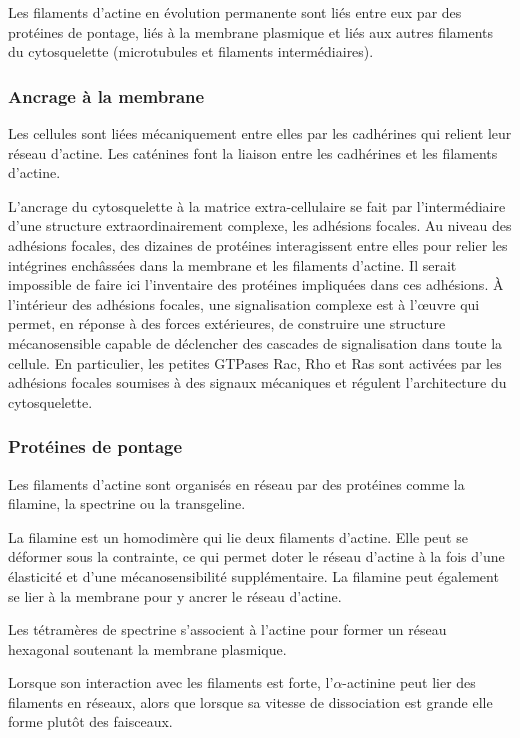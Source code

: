 Les filaments d'actine en évolution permanente sont liés entre eux par des protéines de pontage, liés à la membrane plasmique et liés aux autres filaments du cytosquelette (microtubules et filaments intermédiaires). 


\subsubsection{Ancrage à la membrane}

Les cellules sont liées mécaniquement entre elles par les cadhérines qui relient leur réseau d'actine. Les caténines font la liaison entre les cadhérines et les filaments d'actine. 

L'ancrage du cytosquelette à la matrice extra-cellulaire se fait par l'intermédiaire d'une structure extraordinairement complexe, les adhésions focales. 
Au niveau des adhésions focales, des dizaines de protéines interagissent entre elles pour relier les intégrines enchâssées dans la membrane et les filaments d'actine. 
Il serait impossible de faire ici l'inventaire des protéines impliquées dans ces adhésions. 
À l'intérieur des adhésions focales, une signalisation complexe est à l'\oe uvre qui permet, en réponse à des forces extérieures, de construire une structure mécanosensible capable de déclencher des cascades de signalisation dans toute la cellule. 
En particulier, les petites GTPases Rac, Rho et Ras sont activées par les adhésions focales soumises à des signaux mécaniques et régulent l'architecture du cytosquelette. 

\subsubsection{Protéines de pontage}

Les filaments d'actine sont organisés en réseau par des protéines comme la filamine, la spectrine ou la transgeline. 

La filamine est un homodimère qui lie deux filaments d'actine. Elle peut se déformer sous la contrainte, ce qui permet doter le réseau d'actine à la fois d'une élasticité et d'une mécanosensibilité supplémentaire.
La filamine peut également se lier à la membrane pour y ancrer le réseau d'actine. 

Les tétramères de spectrine s'associent à l'actine pour former un réseau hexagonal soutenant la membrane plasmique. 

Lorsque son interaction avec les filaments est forte, l'$\alpha$-actinine peut lier des filaments en réseaux, alors que lorsque sa vitesse de dissociation est grande elle forme plutôt des faisceaux. 


